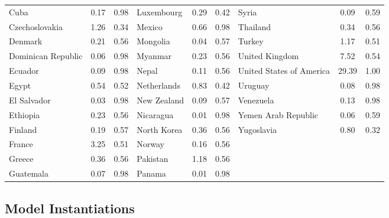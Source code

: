 \begin{landscape}
\begin{table}
\begin{tabular}{lcc||lcc||lcc}
Cuba               & 0.17       & 0.98     & Luxembourg  & 0.29       & 0.42     & Syria                    & 0.09       & 0.59     \\
Czechoslovakia     & 1.26       & 0.34     & Mexico      & 0.66       & 0.98     & Thailand                 & 0.34       & 0.56     \\
Denmark            & 0.21       & 0.56     & Mongolia    & 0.04       & 0.57     & Turkey                   & 1.17       & 0.51     \\
Dominican Republic & 0.06       & 0.98     & Myanmar     & 0.23       & 0.56     & United Kingdom           & 7.52       & 0.54     \\
Ecuador            & 0.09       & 0.98     & Nepal       & 0.11       & 0.56     & United States of America & 29.39      & 1.00     \\
Egypt              & 0.54       & 0.52     & Netherlands & 0.83       & 0.42     & Uruguay                  & 0.08       & 0.98     \\
El Salvador        & 0.03       & 0.98     & New Zealand & 0.09       & 0.57     & Venezuela                & 0.13       & 0.98     \\
Ethiopia           & 0.23       & 0.56     & Nicaragua   & 0.01       & 0.98     & Yemen Arab Republic      & 0.06       & 0.59     \\
Finland            & 0.19       & 0.57     & North Korea & 0.36       & 0.56     & Yugoslavia               & 0.80       & 0.32     \\
France             & 3.25       & 0.51     & Norway      & 0.16       & 0.56     &                          &            &          \\
Greece             & 0.36       & 0.56     & Pakistan    & 1.18       & 0.56     &                          &            &          \\
Guatemala          & 0.07       & 0.98     & Panama      & 0.01       & 0.98     &                          &            &   \\      
  \hline
\end{tabular}

  \tableSpace
\end{table}
\end{landscape}


\subsection{Model Instantiations} \label{models}

